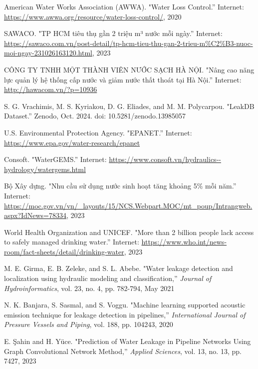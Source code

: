 \renewcommand{\labelsep}{1.5em} 

\begin{thebibliography}{99}
American Water Works Association (AWWA). "Water Loss Control.'' Internet: \url{https://www.awwa.org/resource/water-loss-control/}, 2020

SAWACO. "TP HCM tiêu thụ gần 2 triệu m³ nước mỗi ngày.'' Internet: \url{https://sawaco.com.vn/post-detail/tp-hcm-tieu-thu-gan-2-trieu-m%C2%B3-nuoc-moi-ngay-231026163120.html}, 2023

CÔNG TY TNHH MỘT THÀNH VIÊN NƯỚC SẠCH HÀ NỘI. "Nâng cao năng lực quản lý hệ thống cấp nước và giảm nước thất thoát tại Hà Nội.'' Internet: \url{http://hawacom.vn/?p=10936}

S. G. Vrachimis, M. S. Kyriakou, D. G. Eliades, and M. M. Polycarpou. "LeakDB Dataset.'' Zenodo, Oct. 2024. doi: 10.5281/zenodo.13985057

U.S. Environmental Protection Agency. "EPANET.'' Internet: \url{https://www.epa.gov/water-research/epanet}

Consoft. "WaterGEMS.'' Internet: \url{https://www.consoft.vn/hydraulics--hydrology/watergems.html}

Bộ Xây dựng. "Nhu cầu sử dụng nước sinh hoạt tăng khoảng 5\% mỗi năm.'' Internet: \url{https://moc.gov.vn/vn/_layouts/15/NCS.Webpart.MOC/mt_poup/Intrangweb.aspx?IdNews=78334}, 2023

World Health Organization and UNICEF. "More than 2 billion people lack access to safely managed drinking water.'' Internet: \url{https://www.who.int/news-room/fact-sheets/detail/drinking-water}, 2023

M. E. Girma, E. B. Zeleke, and S. L. Abebe. "Water leakage detection and localization using hydraulic modeling and classification,'' \textit{Journal of Hydroinformatics}, vol. 23, no. 4, pp. 782-794, May 2021

N. K. Banjara, S. Sasmal, and S. Voggu. "Machine learning supported acoustic emission technique for leakage detection in pipelines,'' \textit{International Journal of Pressure Vessels and Piping}, vol. 188, pp. 104243, 2020

E. Şahin and H. Yüce. "Prediction of Water Leakage in Pipeline Networks Using Graph Convolutional Network Method,'' \textit{Applied Sciences}, vol. 13, no. 13, pp. 7427, 2023


\end{thebibliography}
